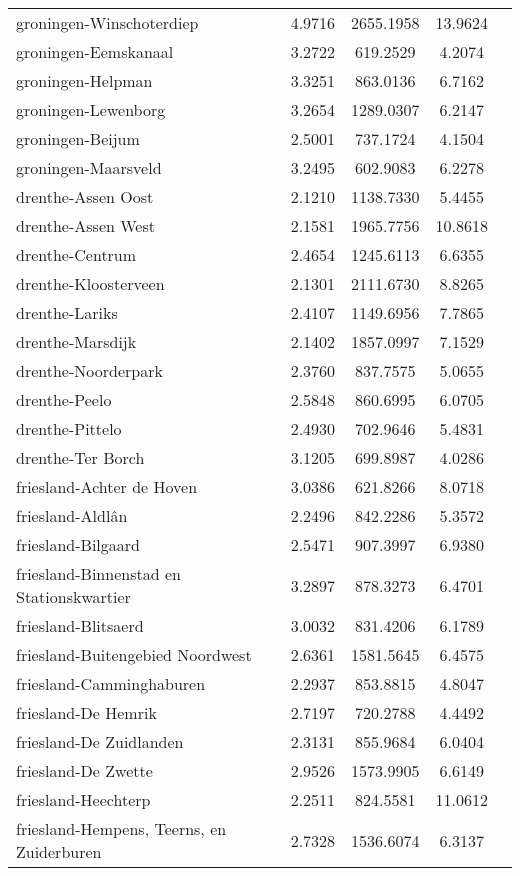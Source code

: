 \begin{longtable}{llccc}
groningen-Winschoterdiep & 4.9716 & 2655.1958 & 13.9624 \\
groningen-Eemskanaal & 3.2722 & 619.2529 & 4.2074 \\
groningen-Helpman & 3.3251 & 863.0136 & 6.7162 \\
groningen-Lewenborg & 3.2654 & 1289.0307 & 6.2147 \\
groningen-Beijum & 2.5001 & 737.1724 & 4.1504 \\
groningen-Maarsveld & 3.2495 & 602.9083 & 6.2278 \\
drenthe-Assen Oost & 2.1210 & 1138.7330 & 5.4455 \\
drenthe-Assen West & 2.1581 & 1965.7756 & 10.8618 \\
drenthe-Centrum & 2.4654 & 1245.6113 & 6.6355 \\
drenthe-Kloosterveen & 2.1301 & 2111.6730 & 8.8265 \\
drenthe-Lariks & 2.4107 & 1149.6956 & 7.7865 \\
drenthe-Marsdijk & 2.1402 & 1857.0997 & 7.1529 \\
drenthe-Noorderpark & 2.3760 & 837.7575 & 5.0655 \\
drenthe-Peelo & 2.5848 & 860.6995 & 6.0705 \\
drenthe-Pittelo & 2.4930 & 702.9646 & 5.4831 \\
drenthe-Ter Borch & 3.1205 & 699.8987 & 4.0286 \\
friesland-Achter de Hoven & 3.0386 & 621.8266 & 8.0718 \\
friesland-Aldlân & 2.2496 & 842.2286 & 5.3572 \\
friesland-Bilgaard & 2.5471 & 907.3997 & 6.9380 \\
friesland-Binnenstad en Stationskwartier & 3.2897 & 878.3273 & 6.4701 \\
friesland-Blitsaerd & 3.0032 & 831.4206 & 6.1789 \\
friesland-Buitengebied Noordwest & 2.6361 & 1581.5645 & 6.4575 \\
friesland-Camminghaburen & 2.2937 & 853.8815 & 4.8047 \\
friesland-De Hemrik & 2.7197 & 720.2788 & 4.4492 \\
friesland-De Zuidlanden & 2.3131 & 855.9684 & 6.0404 \\
friesland-De Zwette & 2.9526 & 1573.9905 & 6.6149 \\
friesland-Heechterp & 2.2511 & 824.5581 & 11.0612 \\
friesland-Hempens, Teerns, en Zuiderburen & 2.7328 & 1536.6074 & 6.3137 \\

\end{longtable}
